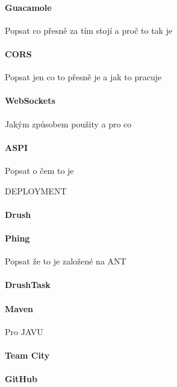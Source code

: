 \documentclass[10pt,draft,oneside]{fithesis2}
\begin{document}
\paragraph*{Guacamole}
Popsat co přesně za tím stojí a proč to tak je

\paragraph*{CORS} 

Popsat jen co to přesně je a jak to pracuje

\paragraph*{WebSockets}

Jakým způsobem použity a pro co

\paragraph*{ASPI}

Popsat o čem to je

DEPLOYMENT

\paragraph*{Drush}

\paragraph*{Phing}

Popsat že to je založené na ANT

\paragraph*{DrushTask}

\paragraph*{Maven}

Pro JAVU

\paragraph*{Team City}

\paragraph*{GitHub}
\end{document}
